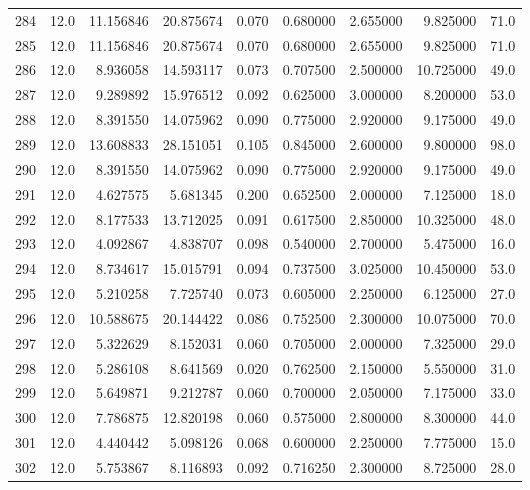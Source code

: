\begin{tabular}{lrrrrrrrr}
284  &   12.0 &  11.156846 &  20.875674 &  0.070 &  0.680000 &  2.655000 &   9.825000 &   71.0 \\
285  &   12.0 &  11.156846 &  20.875674 &  0.070 &  0.680000 &  2.655000 &   9.825000 &   71.0 \\
286  &   12.0 &   8.936058 &  14.593117 &  0.073 &  0.707500 &  2.500000 &  10.725000 &   49.0 \\
287  &   12.0 &   9.289892 &  15.976512 &  0.092 &  0.625000 &  3.000000 &   8.200000 &   53.0 \\
288  &   12.0 &   8.391550 &  14.075962 &  0.090 &  0.775000 &  2.920000 &   9.175000 &   49.0 \\
289  &   12.0 &  13.608833 &  28.151051 &  0.105 &  0.845000 &  2.600000 &   9.800000 &   98.0 \\
290  &   12.0 &   8.391550 &  14.075962 &  0.090 &  0.775000 &  2.920000 &   9.175000 &   49.0 \\
291  &   12.0 &   4.627575 &   5.681345 &  0.200 &  0.652500 &  2.000000 &   7.125000 &   18.0 \\
292  &   12.0 &   8.177533 &  13.712025 &  0.091 &  0.617500 &  2.850000 &  10.325000 &   48.0 \\
293  &   12.0 &   4.092867 &   4.838707 &  0.098 &  0.540000 &  2.700000 &   5.475000 &   16.0 \\
294  &   12.0 &   8.734617 &  15.015791 &  0.094 &  0.737500 &  3.025000 &  10.450000 &   53.0 \\
295  &   12.0 &   5.210258 &   7.725740 &  0.073 &  0.605000 &  2.250000 &   6.125000 &   27.0 \\
296  &   12.0 &  10.588675 &  20.144422 &  0.086 &  0.752500 &  2.300000 &  10.075000 &   70.0 \\
297  &   12.0 &   5.322629 &   8.152031 &  0.060 &  0.705000 &  2.000000 &   7.325000 &   29.0 \\
298  &   12.0 &   5.286108 &   8.641569 &  0.020 &  0.762500 &  2.150000 &   5.550000 &   31.0 \\
299  &   12.0 &   5.649871 &   9.212787 &  0.060 &  0.700000 &  2.050000 &   7.175000 &   33.0 \\
300  &   12.0 &   7.786875 &  12.820198 &  0.060 &  0.575000 &  2.800000 &   8.300000 &   44.0 \\
301  &   12.0 &   4.440442 &   5.098126 &  0.068 &  0.600000 &  2.250000 &   7.775000 &   15.0 \\
302  &   12.0 &   5.753867 &   8.116893 &  0.092 &  0.716250 &  2.300000 &   8.725000 &   28.0 \\

\end{tabular}
